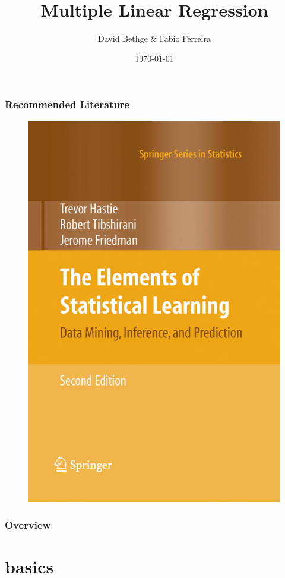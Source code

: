 \documentclass{beamer}
\title[Linear Regression]{Multiple Linear Regression} %
\author{David Bethge \& Fabio Ferreira} %
\institute[] %
{
DHBW Karlsruhe \\ %
\medskip
\textit{} %
}
\date{\today} %
\begin{document}
\begin{frame}
\titlepage %
\end{frame}

\begin{frame}
\frametitle{Recommended Literature}

\begin{figure}
\includegraphics[width=0.4\linewidth]{figures/03/Literature.jpg}
\end{figure}


\end{frame}
\begin{frame}
\frametitle{Overview} %
\tableofcontents %
\end{frame}



\section{basics} %
\end{document}
